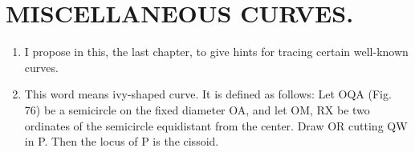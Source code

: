 
\chapter{MISCELLANEOUS CURVES.}


\begin{enumerate}

\item I propose in this, the last chapter, to give hints for tracing certain
        well-known curves.


\item This word means ivy-shaped curve. It is defined as follows: Let OQA (Fig.
        76) be a semicircle on the fixed diameter OA, and let OM, RX be two
        ordinates of the semicircle equidistant from the center. Draw OR
        cutting QW in P. Then the locus of P is the cissoid.


\end{enumerate}
